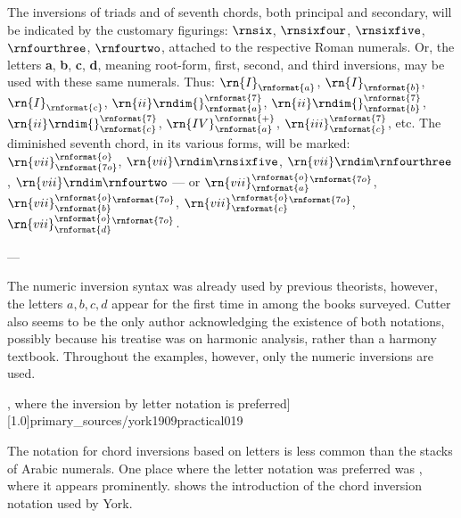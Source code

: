 \begin{italicquotes}
    The inversions of triads and of seventh chords, both
    principal and secondary, will be indicated by the
    customary figurings: $\rnsix$, $\rnsixfour$,
    $\rnsixfive$, $\rnfourthree$, $\rnfourtwo$, attached to
    the respective Roman numerals. Or, the letters
    \textbf{a}, \textbf{b}, \textbf{c}, \textbf{d}, meaning
    root-form, first, second, and third inversions, may be
    used with these same numerals. Thus:
    $\rn{I}_\rnformat{a}$, $\rn{I}_\rnformat{b}$,
    $\rn{I}_\rnformat{c}$,
    $\rn{ii}\rndim{}^\rnformat{7}_\rnformat{a}$,
    $\rn{ii}\rndim{}^\rnformat{7}_\rnformat{b}$,
    $\rn{ii}\rndim{}^\rnformat{7}_\rnformat{c}$,
    $\rn{IV}^\rnformat{+}_\rnformat{a}$,
    $\rn{iii}^\rnformat{7}_\rnformat{c}$, etc. The
    diminished seventh chord, in its various forms, will be
    marked: $\rn{vii}^\rnformat{o}_\rnformat{7o}$,
    $\rn{vii}\rndim\rnsixfive$,
    $\rn{vii}\rndim\rnfourthree$, $\rn{vii}\rndim\rnfourtwo$
    --- or
    $\rn{vii}^{\rnformat{o}}_{\rnformat{a}}{}^\rnformat{7o}$,
    $\rn{vii}^{\rnformat{o}}_{\rnformat{b}}{}^\rnformat{7o}$,
    $\rn{vii}^{\rnformat{o}}_{\rnformat{c}}{}^\rnformat{7o}$,
    $\rn{vii}^{\rnformat{o}}_{\rnformat{d}}{}^\rnformat{7o}$.

    --- \emph{\textcite[p.~4]{cutter1902harmonic}}
\end{italicquotes}

The numeric inversion syntax was already used by previous
theorists, however, the letters ${a, b, c , d}$ appear for
the first time in \textcite{cutter1902harmonic} among the
books surveyed. Cutter also seems to be the only author
acknowledging the existence of both notations, possibly
because his treatise was on harmonic analysis, rather than a
harmony textbook. Throughout the examples, however, only the
numeric inversions are used.


\phdfigure[\textcite[p.~19]{york1909practical}, where the
inversion by letter notation is
preferred][1.0]{primary_sources/york1909practical019}

The notation for chord inversions based on letters is less
common than the stacks of Arabic numerals. One place where
the letter notation was preferred was
\textcite{york1909practical}, where it appears prominently.
 shows the
introduction of the chord inversion notation used by York.
